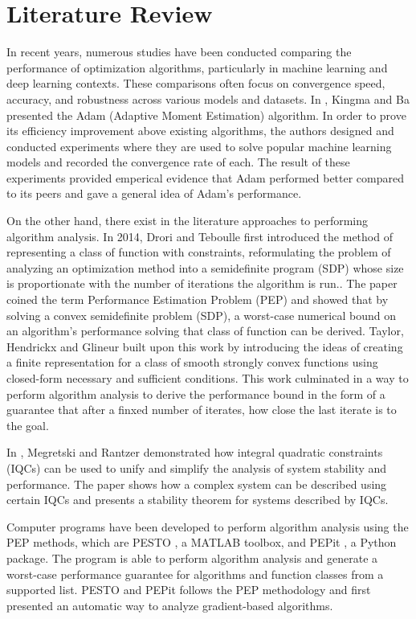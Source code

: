  \chapter{Literature Review}

In recent years, numerous studies have been conducted comparing the performance of optimization algorithms, particularly in machine learning and deep learning contexts. These comparisons often focus on convergence speed, accuracy, and robustness across various models and datasets. In \cite{adam}, Kingma and Ba presented the Adam (Adaptive Moment Estimation) algorithm. In order to prove its efficiency improvement above existing algorithms, the authors designed and conducted experiments where they are used to solve popular machine learning models and recorded the convergence rate of each. The result of these experiments provided emperical evidence that Adam performed better compared to its peers and gave a general idea of Adam's performance.

On the other hand, there exist in the literature approaches to performing algorithm analysis. In 2014, Drori and Teboulle first introduced the method of representing a class of function with constraints, reformulating the problem of analyzing an optimization method into a semidefinite program (SDP) whose size is proportionate with the number of iterations the algorithm is run.\cite{drori2012}. The paper coined the term Performance Estimation Problem (PEP) and showed that by solving a convex semidefinite problem (SDP), a worst-case numerical bound on an algorithm's performance solving that class of function can be derived. Taylor, Hendrickx and Glineur built upon this work by introducing the ideas of creating a finite representation for a class of smooth strongly convex functions using closed-form necessary and sufficient conditions. This work culminated in a way to perform algorithm analysis to derive the performance bound in the form of a guarantee that after a finxed number of iterates, how close the last iterate is to the goal.

In \cite{iqc}, Megretski and Rantzer demonstrated how integral quadratic constraints (IQCs) can be used to unify and simplify the analysis of system stability and performance. The paper shows how a complex system can be described using certain IQCs and presents a stability theorem for systems described by IQCs.

Computer programs have been developed to perform algorithm analysis using the PEP methods, which are PESTO \cite{pesto}, a MATLAB toolbox, and PEPit \cite{pepit}, a Python package. The program is able to perform algorithm analysis and generate a worst-case performance guarantee for algorithms and function classes from a supported list. PESTO and PEPit follows the PEP methodology and first presented an automatic way to analyze gradient-based algorithms.

